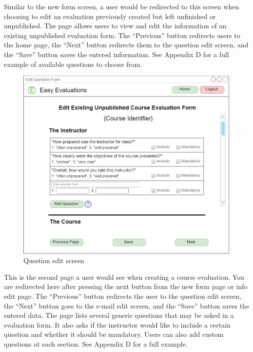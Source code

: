 \documentclass{article}
\begin{document}
Similar to the new form screen, a user would be redirected to this screen when choosing to edit an evaluation previously created but left unfinished or unpublished. The page allows users to view and edit the information of an existing unpublished evaluation form.  The ``Previous'' button redirects users to the home page, the ``Next'' button redirects them to the question edit screen, and the ``Save'' button saves the entered information. See Appendix D for a full example of available questions to choose from.

\newpage

\begin{center}
\begin{figure}[H]
    \centering
    \caption{Question edit screen}
    \includegraphics[width=6.5in]{images/questions_screen.png}
\end{figure}
\end{center}

This is the second page a user would see when creating a course evaluation. You are redirected here after pressing the next button from the new form page or info edit page.  The ``Previous'' button redirects the user to the question edit screen, the ``Next'' button goes to the e-mail edit screen, and the ``Save'' button saves the entered data. The page lists several generic questions that may be asked in a evaluation form. It also asks if the instructor would like to include a certain question and whether it should be mandatory. Users can also add custom questions at each section. See Appendix D for a full example.
\end{document}

